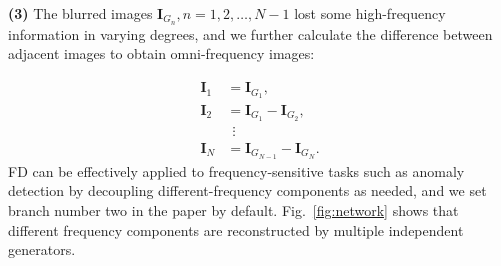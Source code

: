 \documentclass[lettersize,journal]{IEEEtran}
\begin{document}
\noindent\textbf{(3)} The blurred images $\bm{I}_{G_{n}}, n=1, 2, \dots, N-1$ lost some high-frequency information in varying degrees, and we further calculate the difference between adjacent images to obtain omni-frequency images:

\begin{equation}
\begin{aligned}
    \bm{I}_1 &= \bm{I}_{G_{1}},\\
    \bm{I}_2 &= \bm{I}_{G_{1}} - \bm{I}_{G_{2}},\\
    & ~~\vdots \\
    \bm{I}_N &= \bm{I}_{G_{N-1}} - \bm{I}_{G_{N}}.
\end{aligned}
\end{equation}
FD can be effectively applied to frequency-sensitive tasks such as anomaly detection by decoupling different-frequency components as needed, and we set branch number two in the paper by default. Fig.~\ref{fig:network} shows that different frequency components are reconstructed by multiple independent generators.
\end{document}
